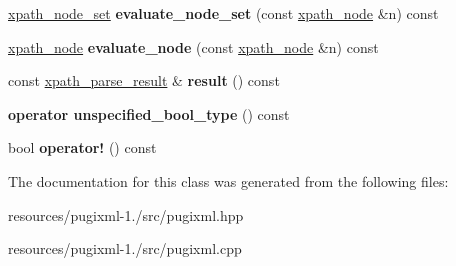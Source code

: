 \begin{DoxyCompactItemize}
\item 
\hypertarget{classpugi_1_1xpath__query_ad5e3826c813e90c30db42f1778bc8adc}{\hyperlink{classpugi_1_1xpath__node__set}{xpath\+\_\+node\+\_\+set} {\bfseries evaluate\+\_\+node\+\_\+set} (const \hyperlink{classpugi_1_1xpath__node}{xpath\+\_\+node} \&n) const }\label{classpugi_1_1xpath__query_ad5e3826c813e90c30db42f1778bc8adc}

\item 
\hypertarget{classpugi_1_1xpath__query_a756612fde24e703bc61fedf8ac4e84ae}{\hyperlink{classpugi_1_1xpath__node}{xpath\+\_\+node} {\bfseries evaluate\+\_\+node} (const \hyperlink{classpugi_1_1xpath__node}{xpath\+\_\+node} \&n) const }\label{classpugi_1_1xpath__query_a756612fde24e703bc61fedf8ac4e84ae}

\item 
\hypertarget{classpugi_1_1xpath__query_a36d9bd4c41c46ee085e7cb4af8ced7d3}{const \hyperlink{structpugi_1_1xpath__parse__result}{xpath\+\_\+parse\+\_\+result} \& {\bfseries result} () const }\label{classpugi_1_1xpath__query_a36d9bd4c41c46ee085e7cb4af8ced7d3}

\item 
\hypertarget{classpugi_1_1xpath__query_a3e3410d6f652ada1ac9e059ebe87184c}{{\bfseries operator unspecified\+\_\+bool\+\_\+type} () const }\label{classpugi_1_1xpath__query_a3e3410d6f652ada1ac9e059ebe87184c}

\item 
\hypertarget{classpugi_1_1xpath__query_aaf62ebc3aa5dbce405ee1dbdd55e779a}{bool {\bfseries operator!} () const }\label{classpugi_1_1xpath__query_aaf62ebc3aa5dbce405ee1dbdd55e779a}

\end{DoxyCompactItemize}


The documentation for this class was generated from the following files\+:\begin{DoxyCompactItemize}
\item 
resources/pugixml-\/1./src/pugixml.\+hpp\item 
resources/pugixml-\/1./src/pugixml.\+cpp\end{DoxyCompactItemize}
